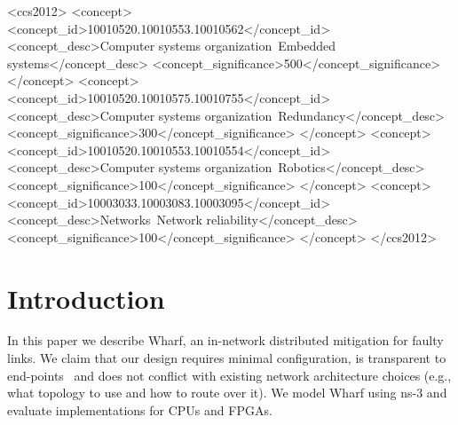 \documentclass[sigconf]{acmart}
\newcommand{\OurSys}{Wharf\xspace}
\begin{document}
%
%
\begin{CCSXML}
<ccs2012>
 <concept>
  <concept_id>10010520.10010553.10010562</concept_id>
  <concept_desc>Computer systems organization~Embedded systems</concept_desc>
  <concept_significance>500</concept_significance>
 </concept>
 <concept>
  <concept_id>10010520.10010575.10010755</concept_id>
  <concept_desc>Computer systems organization~Redundancy</concept_desc>
  <concept_significance>300</concept_significance>
 </concept>
 <concept>
  <concept_id>10010520.10010553.10010554</concept_id>
  <concept_desc>Computer systems organization~Robotics</concept_desc>
  <concept_significance>100</concept_significance>
 </concept>
 <concept>
  <concept_id>10003033.10003083.10003095</concept_id>
  <concept_desc>Networks~Network reliability</concept_desc>
  <concept_significance>100</concept_significance>
 </concept>
</ccs2012>  
\end{CCSXML}





\maketitle

\section{Introduction}

In this paper we describe \OurSys, an in-network distributed mitigation for
faulty links.  We claim that our design requires minimal configuration, is
transparent to end-points~\cite{Saltzer84end-to-endarguments} and does not
conflict with existing network architecture choices (e.g., what topology to use
and how to route over it). We model \OurSys using ns-3 and evaluate
implementations for CPUs and FPGAs.
\end{document}
